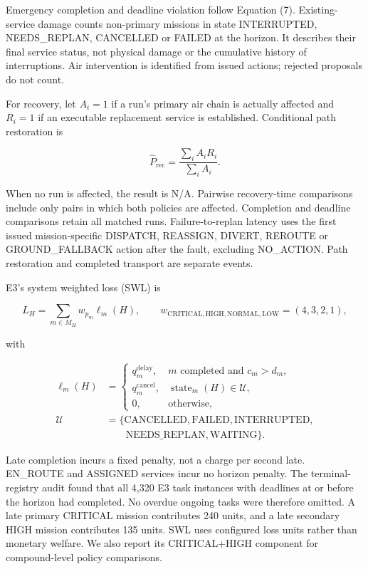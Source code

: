 \documentclass[]{interact}
\theoremstyle{plain}
\theoremstyle{definition}
\theoremstyle{remark}
\begin{document}
Emergency completion and deadline violation follow Equation (7). Existing-service damage counts non-primary missions in state INTERRUPTED, NEEDS\_REPLAN, CANCELLED or FAILED at the horizon. It describes their final service status, not physical damage or the cumulative history of interruptions. Air intervention is identified from issued actions; rejected proposals do not count.

For recovery, let $A_i=1$ if a run's primary air chain is actually affected and $R_i=1$ if an executable replacement service is established. Conditional path restoration is

\begin{equation*}
\widehat P_{\mathrm{rec}}=\frac{\sum_i A_iR_i}{\sum_i A_i}. \tag{10}
\end{equation*}

When no run is affected, the result is N/A. Pairwise recovery-time comparisons include only pairs in which both policies are affected. Completion and deadline comparisons retain all matched runs. Failure-to-replan latency uses the first issued mission-specific DISPATCH, REASSIGN, DIVERT, REROUTE or GROUND\_FALLBACK action after the fault, excluding NO\_ACTION. Path restoration and completed transport are separate events.

E3's system weighted loss (SWL) is

\begin{equation*}
L_H=\sum_{m\in M_H}w_{p_m}\ell_m(H),\qquad
w_{\mathrm{CRITICAL,HIGH,NORMAL,LOW}}=(4,3,2,1), \tag{11}
\end{equation*}

with

\begin{equation*}
\begin{aligned}
\ell_m(H)&=\begin{cases}
q_m^{\mathrm{delay}},&m\text{ completed and }c_m>d_m,\\
q_m^{\mathrm{cancel}},&\operatorname{state}_m(H)\in\mathcal U,\\
0,&\text{otherwise},
\end{cases}
\\[4pt]
\mathcal U&=\{\mathrm{CANCELLED,FAILED,INTERRUPTED},
\\&\qquad\mathrm{NEEDS\_REPLAN,WAITING}\}.
\end{aligned}\tag{12}
\end{equation*}

Late completion incurs a fixed penalty, not a charge per second late. EN\_ROUTE and ASSIGNED services incur no horizon penalty. The terminal-registry audit found that all 4,320 E3 task instances with deadlines at or before the horizon had completed. No overdue ongoing tasks were therefore omitted. A late primary CRITICAL mission contributes 240 units, and a late secondary HIGH mission contributes 135 units. SWL uses configured loss units rather than monetary welfare. We also report its CRITICAL+HIGH component for compound-level policy comparisons.
\end{document}
